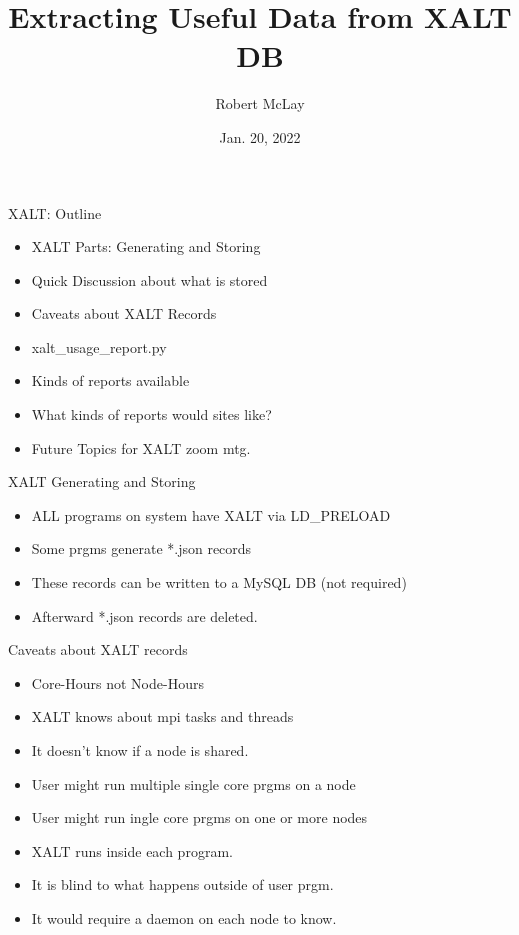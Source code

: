 \documentclass{beamer}
\begin{document}
\title[XALT]{Extracting Useful Data from XALT DB}
\author{Robert McLay} 
\date{Jan. 20, 2022} 

\frame{\titlepage} 

\begin{frame}{XALT: Outline}
  \begin{itemize}
    \item XALT Parts: Generating and Storing
    \item Quick Discussion about what is stored
    \item Caveats about XALT Records
    \item xalt_usage_report.py
    \item Kinds of reports available
    \item What kinds of reports would sites like?
    \item Future Topics for XALT zoom mtg.
  \end{itemize}
\end{frame}

\begin{frame}{XALT Generating and Storing}
  \begin{itemize}
    \item ALL programs on system have XALT via LD\_PRELOAD
    \item Some prgms generate *.json records
    \item These records can be written to a MySQL DB (not required) 
    \item Afterward *.json records are deleted.
  \end{itemize}
\end{frame}

\begin{frame}{Caveats about XALT records}
  \begin{itemize}
    \item Core-Hours not Node-Hours 
    \item XALT knows about mpi tasks and threads
    \item It doesn't know if a node is shared.
    \item User might run multiple single core prgms on a node
    \item User might run ingle core prgms on one or more nodes
    \item XALT runs inside each program.
    \item It is blind to what happens outside of user prgm.
    \item It would require a daemon on each node to know.
  \end{itemize}
\end{frame}
\end{document}
